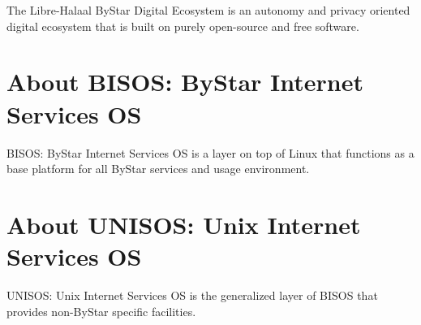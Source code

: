 The Libre-Halaal ByStar Digital Ecosystem is an autonomy and privacy
oriented digital ecosystem that is built on purely open-source and
free software.

\begin{comment}
*  [[elisp:(org-cycle)][| ]] [[elisp:(org-show-subtree)][|=]] [[elisp:(show-children 10)][|V]] [[elisp:(bx:orgm:indirectBufOther)][|>]] [[elisp:(bx:orgm:indirectBufMain)][|I]] [[elisp:(blee:ppmm:org-mode-toggle)][|N]] [[elisp:(org-top-overview)][|O]] [[elisp:(progn (org-shifttab) (org-content))][|C]] [[elisp:(delete-other-windows)][|1]]  /Section/   About BISOS: ByStar Internet Services OS ::  [[elisp:(org-cycle)][| ]]
\end{comment}

\section{About BISOS: ByStar Internet Services OS}

BISOS: ByStar Internet Services OS is a layer on top of Linux that
functions as a base platform for all ByStar services and usage
environment.

\begin{comment}
*  [[elisp:(org-cycle)][| ]] [[elisp:(org-show-subtree)][|=]] [[elisp:(show-children 10)][|V]] [[elisp:(bx:orgm:indirectBufOther)][|>]] [[elisp:(bx:orgm:indirectBufMain)][|I]] [[elisp:(blee:ppmm:org-mode-toggle)][|N]] [[elisp:(org-top-overview)][|O]] [[elisp:(progn (org-shifttab) (org-content))][|C]] [[elisp:(delete-other-windows)][|1]]  /Section/   About UNISOS: Unix Internet Services OS ::  [[elisp:(org-cycle)][| ]]
\end{comment}

\section{About UNISOS: Unix Internet Services OS}

UNISOS: Unix Internet Services OS is the generalized layer of BISOS
that provides non-ByStar specific facilities.


\begin{comment}
*  [[elisp:(org-cycle)][| ]] [[elisp:(org-show-subtree)][|=]] [[elisp:(show-children 10)][|V]] [[elisp:(bx:orgm:indirectBufOther)][|>]] [[elisp:(bx:orgm:indirectBufMain)][|I]] [[elisp:(blee:ppmm:org-mode-toggle)][|N]] [[elisp:(org-top-overview)][|O]] [[elisp:(progn (org-shifttab) (org-content))][|C]] [[elisp:(delete-other-windows)][|1]]  /Section/   About Blee: Bystar Libre-halaal Emacs Environment ::  [[elisp:(org-cycle)][| ]]
\end{comment}

